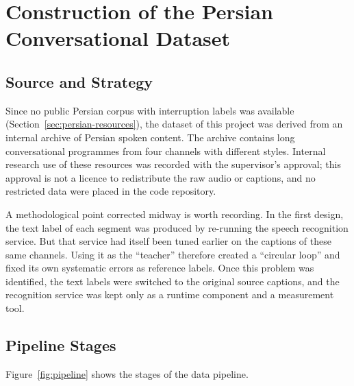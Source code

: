 \section{Construction of the Persian Conversational Dataset}
\label{sec:data}

\subsection{Source and Strategy}

Since no public Persian corpus with interruption labels was available
(Section~\ref{sec:persian-resources}), the dataset of this project was derived from an
internal archive of Persian spoken content. The archive contains long conversational
programmes from four channels with different styles. Internal research use of these
resources was recorded with the supervisor's approval; this approval is not a licence
to redistribute the raw audio or captions, and no restricted data were placed in the
code repository.

A methodological point corrected midway is worth recording. In the first design, the
text label of each segment was produced by re-running the speech recognition service.
But that service had itself been tuned earlier on the captions of these same
channels. Using it as the ``teacher'' therefore created a ``circular loop'' and fixed
its own systematic errors as reference labels. Once this problem was identified, the
text labels were switched to the original source captions, and the recognition
service was kept only as a runtime component and a measurement tool.

\subsection{Pipeline Stages}

Figure~\ref{fig:pipeline} shows the stages of the data pipeline.


